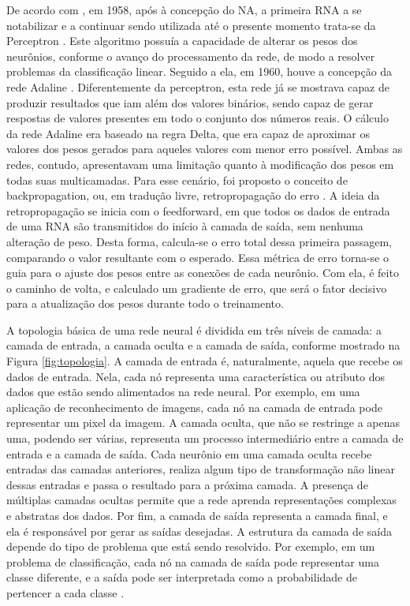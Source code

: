   De acordo com  \cite{rauber2005redes}, em 1958, após à concepção do NA, a primeira RNA a se notabilizar e a continuar sendo utilizada até o presente momento trata-se da Perceptron \cite{rosenblatt1958perceptron}. Este algoritmo possuía a capacidade de alterar os pesos dos neurônios, conforme o avanço do processamento da rede, de modo a resolver problemas da classificação linear. Seguido a ela, em 1960, houve a concepção da rede Adaline \cite{widrow1960adaptive}. Diferentemente da perceptron, esta rede já se mostrava capaz de produzir resultados que iam além dos valores binários, sendo capaz de gerar respostas de valores presentes em todo o conjunto dos números reais. O cálculo da rede Adaline era baseado na regra Delta, que era capaz de aproximar os valores dos pesos gerados para aqueles valores com menor erro possível. Ambas as redes, contudo, apresentavam uma limitação quanto à modificação dos pesos em todas suas multicamadas. Para esse cenário, foi proposto o conceito de backpropagation, ou, em tradução livre, retropropagação do erro \cite{rumelhart1986learning}. A ideia da retropropagação se inicia com o feedforward, em que todos os dados de entrada de uma RNA são transmitidos do início à camada de saída, sem nenhuma alteração de peso. Desta forma, calcula-se o erro total dessa primeira passagem, comparando o valor resultante com o esperado. Essa métrica de erro torna-se o guia para o ajuste dos pesos entre as conexões de cada neurônio. Com ela, é feito o caminho de volta, e calculado um gradiente de erro, que será o fator decisivo para a atualização dos pesos durante todo o treinamento.
  
  A topologia básica de uma rede neural é dividida em três níveis de camada: a camada de entrada, a camada oculta e a camada de saída, conforme mostrado na Figura \ref{fig:topologia}. A camada de entrada é, naturalmente, aquela que recebe os dados de entrada. Nela, cada nó representa uma característica ou atributo dos dados que estão sendo alimentados na rede neural. Por exemplo, em uma aplicação de reconhecimento de imagens, cada nó na camada de entrada pode representar um pixel da imagem. A camada oculta, que não se restringe a apenas uma, podendo ser várias, representa um processo intermediário entre a camada de entrada e a camada de saída. Cada neurônio em uma camada oculta recebe entradas das camadas anteriores, realiza algum tipo de transformação não linear dessas entradas e passa o resultado para a próxima camada. A presença de múltiplas camadas ocultas permite que a rede aprenda representações complexas e abstratas dos dados. Por fim, a camada de saída representa a camada final, e ela é responsável por gerar as saídas desejadas. A estrutura da camada de saída depende do tipo de problema que está sendo resolvido. Por exemplo, em um problema de classificação, cada nó na camada de saída pode representar uma classe diferente, e a saída pode ser interpretada como a probabilidade de pertencer a cada classe \cite{rauber2005redes}.
  
